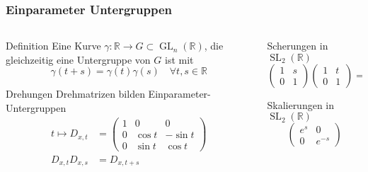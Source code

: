 %
%
%
\bgroup
\begin{frame}[t]
\setlength{\abovedisplayskip}{5pt}
\setlength{\belowdisplayskip}{5pt}
\frametitle{Einparameter Untergruppen}
\vspace{-20pt}
\begin{columns}[t,onlytextwidth]
\begin{column}{0.48\textwidth}
\begin{block}{Definition}
Eine Kurve $\gamma\colon \mathbb{R}\to G\subset\operatorname{GL}_n(\mathbb{R})$,
die gleichzeitig eine Untergruppe von $G$ ist mit
\[
\gamma(t+s) = \gamma(t)\gamma(s)\quad\forall t,s\in\mathbb{R}
\]
\end{block}
\begin{block}{Drehungen}
Drehmatrizen bilden Einparameter- Untergruppen
\begin{align*}
t \mapsto D_{x,t}
&=
\begin{pmatrix}
1&0&0\\
0&\cos t&-\sin t\\
0&\sin t& \cos t
\end{pmatrix}
\\
D_{x,t}D_{x,s}
&=
D_{x,t+s}
\end{align*}
\end{block}
\end{column}
\begin{column}{0.48\textwidth}
\begin{block}{Scherungen in $\operatorname{SL}_2(\mathbb{R})$}
\vspace{-12pt}
\[
\begin{pmatrix}
1&s\\
0&1
\end{pmatrix}
\begin{pmatrix}
1&t\\
0&1
\end{pmatrix}
=
\begin{pmatrix}
1&s+t\\
0&1
\end{pmatrix}
\]
\end{block}
\vspace{-12pt}
\begin{block}{Skalierungen in $\operatorname{SL}_2(\mathbb{R})$}
\vspace{-12pt}
\[
\begin{pmatrix}
e^s&0\\0&e^{-s}
\end{pmatrix}
\]
\end{block}
\end{column}
\end{columns}
\end{frame}
